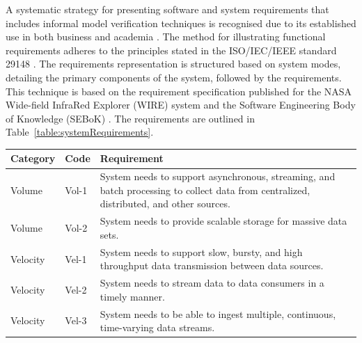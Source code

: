 \documentclass[review]{elsarticle}
\begin{document}
A systematic strategy for presenting software and system requirements that includes informal model verification techniques is recognised due to its established use in both business and academia \cite{kassab2014state}. The method for illustrating functional requirements adheres to the principles stated in the ISO/IEC/IEEE standard 29148 \cite{ISO29148}. The requirements representation is structured based on system modes, detailing the primary components of the system, followed by the requirements. This technique is based on the requirement specification published for the NASA Wide-field InfraRed Explorer (WIRE) system \cite{NASA} and the Software Engineering Body of Knowledge (SEBoK) \cite{abran2004software}. The requirements are outlined in Table~\ref{table:systemRequirements}.

\begin{longtable}

  \renewcommand{\arraystretch}{1.3}

  \caption{Terramycelium Software and System Requirements}

  \label{table:systemRequirements}

  \centering

  \begin{tabular}{|l|l|p{10cm}|}

  \hline

  \textbf{Category} & \textbf{Code} & \textbf{Requirement} \\

  \hline

  Volume & Vol-1 & System needs to support asynchronous, streaming, and batch processing to collect data from centralized, distributed, and other sources. \\

  \hline

  Volume & Vol-2 & System needs to provide scalable storage for massive data sets. \\

  \hline

  Velocity & Vel-1 & System needs to support slow, bursty, and high throughput data transmission between data sources. \\

  \hline

  Velocity & Vel-2 & System needs to stream data to data consumers in a timely manner. \\

  \hline

  Velocity & Vel-3 & System needs to be able to ingest multiple, continuous, time-varying data streams. \\


\end{tabular}
\end{longtable}
\end{document}
